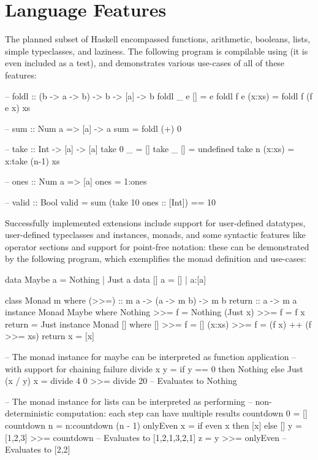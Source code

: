 \documentclass[dissertation.tex]{subfiles}
\begin{document}
\section{Language Features}
{
    The planned subset of Haskell encompassed functions, arithmetic, booleans, lists, simple typeclasses, and laziness. The following program is compilable using \compilername (it is even included as a test), and demonstrates various use-cases of all of these features:

    \begin{haskellfigure}
    -- foldl :: (b -> a -> b) -> b -> [a] -> b
    foldl _ e [] = e
    foldl f e (x:xs) = foldl f (f e x) xs

    -- sum :: Num a => [a] -> a
    sum = foldl (+) 0

    -- take :: Int -> [a] -> [a]
    take 0 _ = []
    take _ [] = undefined
    take n (x:xs) = x:take (n-1) xs

    -- ones :: Num a => [a]
    ones = 1:ones

    -- valid :: Bool
    valid = sum (take 10 ones :: [Int]) == 10
    \end{haskellfigure}

    Successfully implemented extensions include support for user-defined datatypes, user-defined typeclasses and instances, monads, and some syntactic features like operator sections and support for point-free notation: these can be demonstrated by the following program, which exemplifies the monad definition and use-cases:

    \begin{haskellfigure}
    data Maybe a = Nothing | Just a
    data [] a = [] | a:[a]
    
    class Monad m where
        (>>=) :: m a -> (a -> m b) -> m b
        return :: a -> m a
    instance Monad Maybe where
        Nothing >>= f = Nothing
        (Just x) >>= f = f x
        return = Just
    instance Monad [] where
        [] >>= f = []
        (x:xs) >>= f = (f x) ++ (f >>= xs)
        return x = [x]

    -- The monad instance for maybe can be interpreted as function application
    -- with support for chaining failure
    divide x y = if y == 0 then Nothing else Just (x / y)
    x = divide 4 0 >>= divide 20 -- Evaluates to Nothing

    -- The monad instance for lists can be interpreted as performing
    -- non-deterministic computation: each step can have multiple results
    countdown 0 = []
    countdown n = n:countdown (n - 1)
    onlyEven x = if even x then [x] else []
    y = [1,2,3] >>= countdown -- Evaluates to [1,2,1,3,2,1]
    z = y >>= onlyEven -- Evaluates to [2,2]
    \end{haskellfigure}

}
\end{document}
